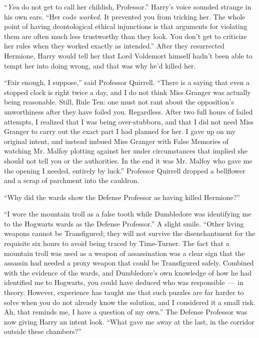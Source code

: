 ``\emph{You} do not get to call her childish, Professor.'' Harry's voice sounded strange in his own ears. ``Her code \emph{worked.} It prevented you from tricking her. The whole point of having deontological ethical injunctions is that arguments for violating them are often much less trustworthy than they look. You don't get to criticize her rules when they worked exactly as intended.'' After they resurrected Hermione, Harry would tell her that Lord Voldemort himself hadn't been able to tempt her into doing wrong, and that was why he'd killed her.

``Fair enough, I suppose,'' said Professor Quirrell. ``There is a saying that even a stopped clock is right twice a day, and I do not think Miss Granger was actually being reasonable. Still, Rule Ten: one must not rant about the opposition's unworthiness after they have foiled you. Regardless. After two full hours of failed attempts, I realized that I was being over-stubborn, and that I did not need Miss Granger to carry out the exact part I had planned for her. I gave up on my original intent, and instead imbued Miss Granger with False Memories of watching Mr. Malfoy plotting against her under circumstances that implied she should not tell you or the authorities. In the end it was Mr. Malfoy who gave me the opening I needed, entirely by luck.'' Professor Quirrell dropped a bellflower and a scrap of parchment into the cauldron.

``Why did the wards show the Defense Professor as having killed Hermione?''

``I wore the mountain troll as a false tooth while Dumbledore was identifying me to the Hogwarts wards as the Defense Professor.'' A slight smile. ``Other living weapons cannot be Transfigured; they will not survive the disenchantment for the requisite six hours to avoid being traced by Time-Turner. The fact that a mountain troll was used as a weapon of assassination was a clear sign that the assassin had needed a proxy weapon that could be Transfigured safely. Combined with the evidence of the wards, and Dumbledore's own knowledge of how he had identified me to Hogwarts, you could have deduced who was responsible~--- in theory. However, experience has taught me that such puzzles are far harder to solve when you do not already know the solution, and I considered it a small risk. Ah, that reminds me, I have a question of my own.'' The Defense Professor was now giving Harry an intent look. ``What gave me away at the last, in the corridor outside these chambers?''


